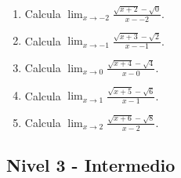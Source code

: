 \documentclass[11pt,a4paper]{article}
\begin{document}
\begin{enumerate}[label=\textbf{E\arabic*.},start=521]
\item Calcula $\displaystyle\lim_{x\to -2}\frac{\sqrt{x+2}-\sqrt{0}}{x--2}$.

\item Calcula $\displaystyle\lim_{x\to -1}\frac{\sqrt{x+3}-\sqrt{2}}{x--1}$.

\item Calcula $\displaystyle\lim_{x\to 0}\frac{\sqrt{x+4}-\sqrt{4}}{x-0}$.

\item Calcula $\displaystyle\lim_{x\to 1}\frac{\sqrt{x+5}-\sqrt{6}}{x-1}$.

\item Calcula $\displaystyle\lim_{x\to 2}\frac{\sqrt{x+6}-\sqrt{8}}{x-2}$.

\end{enumerate}

\newpage

\subsection{Nivel 3 - Intermedio}
\end{document}
